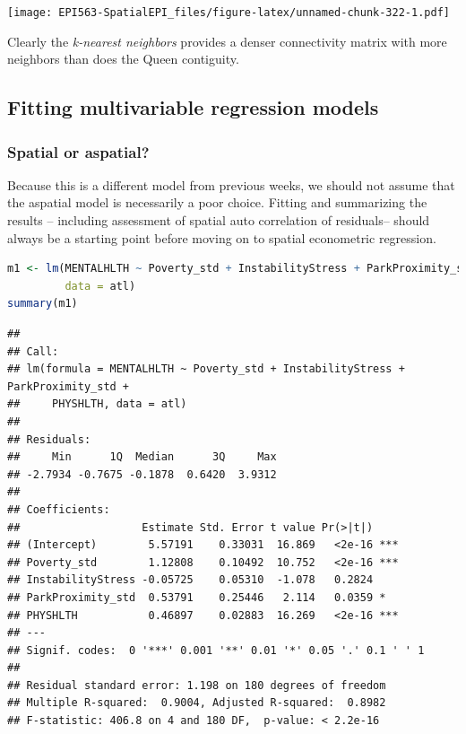 \documentclass[
]{book}
\begin{document}
\texttt{[image: EPI563-SpatialEPI\_files/figure-latex/unnamed-chunk-322-1.pdf]}

Clearly the \emph{k-nearest neighbors} provides a denser connectivity matrix with more neighbors than does the Queen contiguity.

\hypertarget{fitting-multivariable-regression-models}{%
\subsection{Fitting multivariable regression models}\label{fitting-multivariable-regression-models}}

\hypertarget{spatial-or-aspatial}{%
\subsubsection{Spatial or aspatial?}\label{spatial-or-aspatial}}

Because this is a different model from previous weeks, we should not assume that the aspatial model is necessarily a poor choice. Fitting and summarizing the results -- including assessment of spatial auto correlation of residuals-- should always be a starting point before moving on to spatial econometric regression.

\begin{lstlisting}[language=R]
m1 <- lm(MENTALHLTH ~ Poverty_std + InstabilityStress + ParkProximity_std  + PHYSHLTH,
         data = atl)
summary(m1)
\end{lstlisting}

\begin{lstlisting}
## 
## Call:
## lm(formula = MENTALHLTH ~ Poverty_std + InstabilityStress + ParkProximity_std + 
##     PHYSHLTH, data = atl)
## 
## Residuals:
##     Min      1Q  Median      3Q     Max 
## -2.7934 -0.7675 -0.1878  0.6420  3.9312 
## 
## Coefficients:
##                   Estimate Std. Error t value Pr(>|t|)    
## (Intercept)        5.57191    0.33031  16.869   <2e-16 ***
## Poverty_std        1.12808    0.10492  10.752   <2e-16 ***
## InstabilityStress -0.05725    0.05310  -1.078   0.2824    
## ParkProximity_std  0.53791    0.25446   2.114   0.0359 *  
## PHYSHLTH           0.46897    0.02883  16.269   <2e-16 ***
## ---
## Signif. codes:  0 '***' 0.001 '**' 0.01 '*' 0.05 '.' 0.1 ' ' 1
## 
## Residual standard error: 1.198 on 180 degrees of freedom
## Multiple R-squared:  0.9004,	Adjusted R-squared:  0.8982 
## F-statistic: 406.8 on 4 and 180 DF,  p-value: < 2.2e-16
\end{lstlisting}
\end{document}
